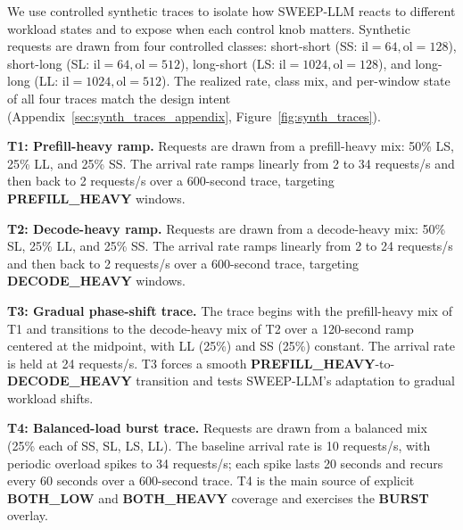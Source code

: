 
We use controlled synthetic traces to isolate how SWEEP-LLM reacts to different workload states and to expose when each control knob matters.
Synthetic requests are drawn from four controlled classes: short-short (SS: $\mathrm{il}=64, \mathrm{ol}=128$), short-long (SL: $\mathrm{il}=64, \mathrm{ol}=512$), long-short (LS: $\mathrm{il}=1024, \mathrm{ol}=128$), and long-long (LL: $\mathrm{il}=1024, \mathrm{ol}=512$).
The realized rate, class mix, and per-window state of all four traces match the design intent (Appendix~\ref{sec:synth_traces_appendix}, Figure~\ref{fig:synth_traces}).


\textbf{T1: Prefill-heavy ramp.}
Requests are drawn from a prefill-heavy mix: 50\% LS, 25\% LL, and 25\% SS. The arrival rate ramps linearly from 2 to 34 requests/s and then back to 2 requests/s over a 600-second trace, targeting \textbf{PREFILL\_HEAVY} windows.

\textbf{T2: Decode-heavy ramp.}
Requests are drawn from a decode-heavy mix: 50\% SL, 25\% LL, and 25\% SS. The arrival rate ramps linearly from 2 to 24 requests/s and then back to 2 requests/s over a 600-second trace, targeting \textbf{DECODE\_HEAVY} windows.

\textbf{T3: Gradual phase-shift trace.}
The trace begins with the prefill-heavy mix of T1 and transitions to the decode-heavy mix of T2 over a 120-second ramp centered at the midpoint, with LL (25\%) and SS (25\%) constant. The arrival rate is held at 24 requests/s. 
T3 forces a smooth \textbf{PREFILL\_HEAVY}-to-\textbf{DECODE\_HEAVY} transition and tests SWEEP-LLM's adaptation to gradual workload shifts.

\textbf{T4: Balanced-load burst trace.}
Requests are drawn from a balanced mix (25\% each of SS, SL, LS, LL). 
The baseline arrival rate is 10 requests/s, with periodic overload spikes to 34 requests/s; each spike lasts 20 seconds and recurs every 60 seconds over a 600-second trace. 
T4 is the main source of explicit \textbf{BOTH\_LOW} and \textbf{BOTH\_HEAVY} coverage and exercises the \textbf{BURST} overlay.

